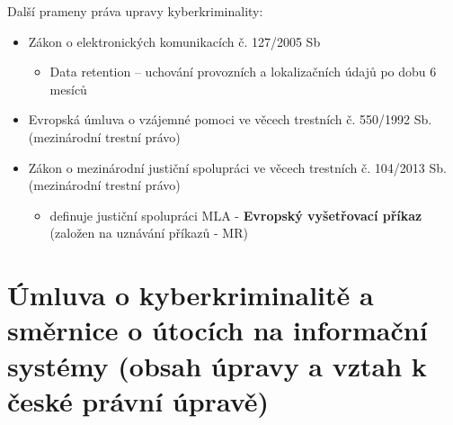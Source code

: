 Další prameny práva upravy kyberkriminality:
\begin{itemize}
    \item Zákon o elektronických komunikacích č. 127/2005 Sb
        \begin{itemize}
            \item Data retention -- uchování provozních a lokalizačních údajů po dobu 6 mesíců
        \end{itemize}
    \item Evropská úmluva o vzájemné pomoci ve věcech trestních č.
    550/1992 Sb. (mezinárodní trestní právo)
    \item Zákon o mezinárodní justiční spolupráci ve věcech trestních
    č. 104/2013 Sb. (mezinárodní trestní právo)
    \begin{itemize}
            \item definuje justiční spolupráci MLA - \textbf{Evropský vyšetřovací příkaz} (založen na uznávání příkazů - MR)
        \end{itemize}
\end{itemize}


\newpage
\section{Úmluva o kyberkriminalitě a směrnice o útocích na informační systémy (obsah úpravy a vztah k české právní úpravě)}

